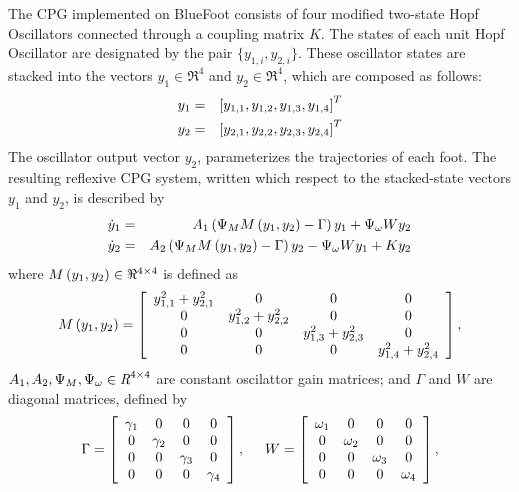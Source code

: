 		The CPG implemented on BlueFoot consists of four modified two-state Hopf Oscillators connected through a coupling matrix $K$. The states of each \Ith unit Hopf Oscillator are designated by the pair $\{y_{1,i},y_{2,i}\}$. These oscillator states are stacked into the vectors $y_{1}\in \Re^{4}$ and $y_{2}\in \Re^{4}$, which are composed as follows:
	\begin{eqnarray*}
		y_{1} &=& \left[y_{1,1},y_{1,2},y_{1,3},y_{1,4}\right]^{T}\nonumber\\
		y_{2} &=& \left[y_{2,1},y_{2,2},y_{2,3},y_{2,4}\right]^{T}
	\end{eqnarray*}
The oscillator output vector $y_{2}$, parameterizes the trajectories of each \Ith foot. The resulting reflexive CPG system, written which respect to the stacked-state vectors $y_{1}$ and $y_{2}$, is described by
		\begin{eqnarray}
			\dot{y}_{1} &=& A_{1}\wrap{ \Psi_{M} M\wrap{y_{1},y_{2}} - \Gamma}{y}_{1} + \Psi_{\omega} W {y}_{2} 			\nonumber\\
			\dot{y}_{2} &=& A_{2}\wrap{ \Psi_{M} M\wrap{y_{1},y_{2}} - \Gamma}{y}_{2} - \Psi_{\omega} W {y}_{1} + K {y}_{2}	%
			\label{eq::cpg_ss_def}
		\end{eqnarray}
		where $M\left(y_{1},y_{2}\right) \in \Re^{4\times4}$ is defined as
		\newcommand{\yy}[1]{y_{1,#1}^{2} + y_{2,#1}^{2}}
		\begin{equation*}
			M\wrap{y_{1},y_{2}} = \left[
			\begin{array}{cccc}
			\yy{1} 	& 	0 		& 	0 		& 	0 		\\ 
			0		& 	\yy{2}  & 	0 		& 	0 		\\ 
			0 		& 	0 		& 	\yy{3}  & 	0 		\\ 
			0 		& 	0 		& 	0 		& 	\yy{4}  \\ 
			\end{array}
			\right],
		\end{equation*}
${A_{1},A_{2}, \Psi_{M}, \Psi_{\omega}} \in\emph{R}^{4\times4}$ are constant oscilattor gain matrices; and $\Gamma$ and $W$ are diagonal matrices, defined by
		\begin{equation*}
			\Gamma = \left[
			\begin{array}{cccc}
			\gamma_{1} 	& 	0 				& 	0 				& 	0 		\\ 
			0				& 	\gamma_{2} 	& 	0 				& 	0 		\\ 
			0 				& 	0 				& 	\gamma_{3} 	& 	0 		\\ 
			0 				& 	0 				& 	0 				& 	\gamma_{4}  \\ 
			\end{array}
			\right],
			\hspace{5mm}
			W = \left[
			\begin{array}{cccc}
			\omega_{1} 	& 	0 				& 	0 				& 	0 		\\ 
			0				& 	\omega_{2} 	& 	0 				& 	0 		\\ 
			0 				& 	0 				& 	\omega_{3} 	& 	0 		\\ 
			0 				& 	0 				& 	0 				& 	\omega_{4}  \\ 
			\end{array}
			\right],
		\end{equation*}
